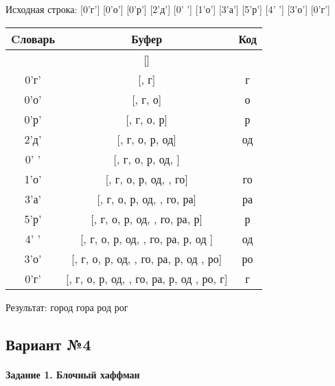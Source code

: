 \documentclass[a4paper, 12pt]{article}
\begin{document}
Исходная строка: [0'г'] [0'о'] [0'р'] [2'д'] [0' '] [1'о'] [3'а'] [5'р'] [4' '] [3'о'] [0'г']\\
\begin{table}[h!]
\centering
\begin{tabular}{|c|c|c|}
\hline
 Cловарь & Буфер & Код  \\ \hline
 & [] & 
\\ \hline
0'г' & [, г] & г
\\ \hline
0'о' & [, г, о] & о
\\ \hline
0'р' & [, г, о, р] & р
\\ \hline
2'д' & [, г, о, р, од] & од
\\ \hline
0' ' & [, г, о, р, од,  ] &  
\\ \hline
1'о' & [, г, о, р, од,  , го] & го
\\ \hline
3'а' & [, г, о, р, од,  , го, ра] & ра
\\ \hline
5'р' & [, г, о, р, од,  , го, ра,  р] &  р
\\ \hline
4' ' & [, г, о, р, од,  , го, ра,  р, од ] & од 
\\ \hline
3'о' & [, г, о, р, од,  , го, ра,  р, од , ро] & ро
\\ \hline
0'г' & [, г, о, р, од,  , го, ра,  р, од , ро, г] & г
\\ \hline
\end{tabular}
\end{table}

Результат: город гора род рог
\pagebreak
\subsection{Вариант №4}
\paragraph{Задание 1. Блочный хаффман \\}
\end{document}
